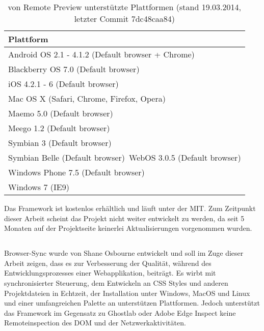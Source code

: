 	\begin{table}[H]
 		\centering
			\begin{tabular}{| p{13cm} |}
			
			\hline
				Plattform\\
			\hline
			\hline
				Android OS 2.1 - 4.1.2 (Default browser + Chrome)\\
				Blackberry OS 7.0 (Default browser)\\
				iOS 4.2.1 - 6 (Default browser)\\
				Mac OS X (Safari, Chrome, Firefox, Opera)\\
				Maemo 5.0 (Default browser)\\
				Meego 1.2 (Default browser)\\
				Symbian 3 (Default browser)\\
				Symbian Belle (Default browser)\
				WebOS 3.0.5 (Default browser)\\
				Windows Phone 7.5 (Default browser)\\	
				Windows 7 (IE9)\\
				\hline
				\end{tabular}
			\caption{von Remote Preview unterstützte Plattformen (stand 19.03.2014, letzter \Gls{Commit} 7dc48caa84)}
	\end{table} 
	Das \Gls{Framework} ist kostenlos erhältlich und läuft unter der \Gls{MIT}. Zum Zeitpunkt dieser Arbeit scheint das Projekt nicht 		weiter entwickelt zu werden, da seit 5 Monaten auf der Projektseite keinerlei Aktualisierungen vorgenommen wurden.

		
	\subsection{}
	Browser-Sync wurde von Shane Osbourne entwickelt und soll im Zuge dieser Arbeit zeigen, dass es zur Verbesserung der Qualität, während des Entwicklungsprozesses einer Webapplikation, beiträgt. Es wirbt mit synchronisierter Steuerung, dem Entwickeln an CSS Styles und anderen Projektdateien in Echtzeit, der Installation unter Windows, MacOS und Linux und einer umfangreichen Palette an unterstützen Plattformen. Jedoch unterstützt das \Gls{Framework} im Gegensatz zu Ghostlab oder Adobe Edge Inspect keine Remoteinspection des \Gls{DOM} und der Netzwerkaktivitäten.
	
